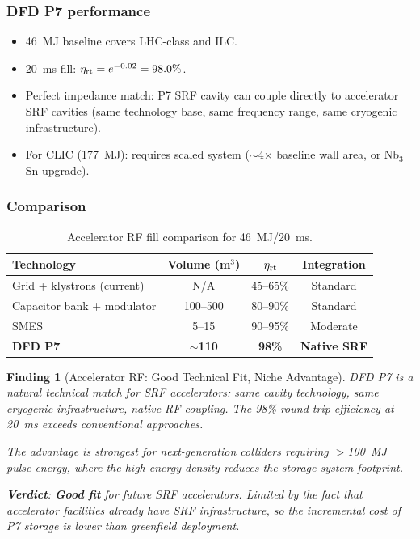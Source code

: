 \documentclass[11pt]{article}
\newtheorem{finding}{Finding}
\begin{document}
\subsubsection{DFD P7 performance}
\begin{itemize}[nosep]
  \item 46~MJ baseline covers LHC-class and ILC.
  \item 20~ms fill: $\eta_{\rm rt} = e^{-0.02} = 98.0\%$.
  \item Perfect impedance match: P7 SRF cavity can couple directly
    to accelerator SRF cavities (same technology base, same frequency
    range, same cryogenic infrastructure).
  \item For CLIC (177~MJ): requires scaled system ($\sim$4$\times$
    baseline wall area, or Nb$_3$Sn upgrade).
\end{itemize}

\subsubsection{Comparison}

\begin{table}[h]
\centering
\caption{Accelerator RF fill comparison for 46~MJ/20~ms.}
\label{tab:accel}
\begin{tabular}{@{}lccc@{}}
\toprule
Technology & Volume (m$^3$) & $\eta_{\rm rt}$ & Integration \\
\midrule
Grid + klystrons (current) & N/A & 45--65\% & Standard \\
Capacitor bank + modulator & 100--500 & 80--90\% & Standard \\
SMES & 5--15 & 90--95\% & Moderate \\
\textbf{DFD P7} & \textbf{$\sim$110} & \textbf{98\%} & \textbf{Native SRF} \\
\bottomrule
\end{tabular}
\end{table}

\begin{finding}[Accelerator RF: Good Technical Fit, Niche Advantage]
\label{find:accel}
DFD P7 is a natural technical match for SRF accelerators: same cavity
technology, same cryogenic infrastructure, native RF coupling. The 98\%
round-trip efficiency at 20~ms exceeds conventional approaches.

The advantage is strongest for next-generation colliders requiring
$>$100~MJ pulse energy, where the high energy density reduces the
storage system footprint.

\textbf{Verdict}: \textbf{Good fit} for future SRF accelerators.
Limited by the fact that accelerator facilities already have SRF
infrastructure, so the incremental cost of P7 storage is lower than
greenfield deployment.
\end{finding}
\end{document}
